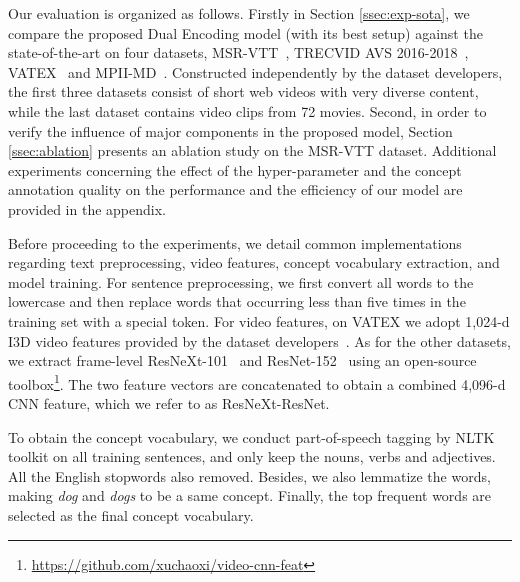 

Our evaluation is organized as follows. Firstly in Section \ref{ssec:exp-sota}, we compare the proposed Dual Encoding model (with its best setup) against the state-of-the-art on four datasets, \ie MSR-VTT~\cite{xu2016msr}, TRECVID AVS 2016-2018~\cite{AwadTRECVID16,AwadTRECVID17,AwadTRECVID18}, VATEX~\cite{wang2019vatex} and MPII-MD~\cite{rohrbach2015dataset}. Constructed independently by the dataset developers, the first three datasets consist of short web videos with very diverse content, while the last dataset contains video clips from 72 movies. 
Second, in order to verify the influence of major components in the proposed model, Section \ref{ssec:ablation} presents an ablation study on the MSR-VTT dataset.  Additional experiments concerning the effect of the hyper-parameter  and the concept annotation quality on the performance and the efficiency of our model are provided in the appendix.



Before proceeding to the experiments, we detail common implementations regarding text preprocessing, video features, concept vocabulary extraction, and model training. 
For sentence preprocessing, we first convert all words to the lowercase and then replace words that occurring less than five times in the training set with a special token. 
For video features, on VATEX we adopt 1,024-d I3D \cite{carreira2017quo} video features provided by the dataset developers~\cite{wang2019vatex}.
As for the other datasets, we extract frame-level ResNeXt-101~\cite{xie2017aggregated,mettes2020shuffled} and ResNet-152~\cite{cvpr2016-resnet} using an open-source toolbox\footnote{\url{https://github.com/xuchaoxi/video-cnn-feat}}. The two feature vectors are concatenated to obtain a combined 4,096-d CNN feature, which we refer to as ResNeXt-ResNet.


To obtain the concept vocabulary, we conduct part-of-speech tagging by NLTK toolkit on all training sentences, and only keep the nouns, verbs and adjectives. All the English stopwords also removed. Besides, we also lemmatize the words, making \textit{dog} and \textit{dogs} to be a same concept. Finally, the top  frequent words are selected as the final concept vocabulary.

